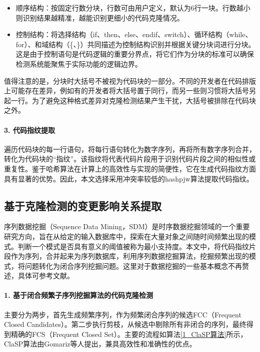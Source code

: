 \begin{itemize}
    \item 顺序结构：按固定行数分块，行数可由用户定义，默认为6行一块。行数越小则识别结果越精准，越能识别更细小的代码克隆情况。
    
    \item 控制结构：将选择结构（if、then、else、endif、switch）、循环结构（while、for）、和域结构（\{、\}）共同描述为控制结构识别并根据关键分块词进行分块。这是由于控制语句是代码逻辑的重要分界点，将它们作为分块的标准可以确保检测系统能聚焦于实际功能的逻辑边界。
\end{itemize}

值得注意的是，分块时大括号不被视为代码块的一部分。不同的开发者在代码排版上可能存在差异，例如有的开发者将大括号置于同行，而另一些则习惯将大括号另起一行。为了避免这种格式差异对克隆检测结果产生干扰，大括号被排除在代码块之外。

\paragraph{3. 代码指纹提取} 遍历代码块的每一行语句，将每行语句转化为数字序列，再将所有数字序列合并，转化为代码块的“指纹”。该指纹将代表代码片段用于识别代码片段之间的相似性或重复性。鉴于哈希算法在计算上的高效性与实现的简便性，它在生成代码指纹方面具有显著的优势。因此，本文选择采用冲突率较低的hashpjw算法提取代码指纹。

\subsection{基于克隆检测的变更影响关系提取}
序列数据挖掘（Sequence Data Mining，SDM）是时序数据挖掘领域的一个重要研究方向，旨在从给定的输入数据库中，探索在大量对象之间随时间频繁出现的模式。判断一个模式是否具有意义的阈值被称为最小支持度。本文中，将代码指纹片段作为序列，合并起来为序列数据库，利用序列数据挖掘算法，挖掘频繁出现的模式，将问题转化为闭合序列挖掘问题。这里对于数据挖掘的一些基本概念不再赘述，具体可参考文献\cite{2013ClaSP}。

\paragraph{1. 基于闭合频繁子序列挖掘算法的代码克隆检测}主要分为两步，首先生成频繁序列，作为频繁闭合序列的候选FCC（Frequent Closed Candidates）。第二步执行剪枝，从候选中剔除所有非闭合的序列，最终得到精确的FCS（Frequent Closed Set）。主要的流程如算法\ref{1_ClaSP算法}所示，ClaSP算法由Gomariz等人\cite{2013ClaSP}提出，兼具高效性和准确性的优点。

